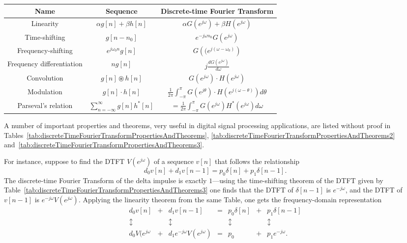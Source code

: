 \documentclass[\documentfontsize, twocolumn]{\classname}
\begin{document}
\begin{table*}[ht]
\centering
\begin{tabular}{ccc}
    \hline
    \textbf{Name} & \textbf{Sequence} & \textbf{Discrete-time Fourier Transform} \\
    \hline
    Linearity & $\alpha g[n] + \beta h[n]$ & $\alpha G(e^{j\omega}) + \beta H(e^{j\omega})$\\
    Time-shifting & $g[n-n_0]$ & $e^{-j\omega n_0} G(e^{j\omega})$ \\
    Frequency-shifting & $e^{j\omega_0 n}g[n]$ & $G\left((e^{j(\omega - \omega_0)}\right)$ \\
    Frequency differentiation & $ng[n]$ & $j\frac {dG(e^{j\omega})}{d\omega}$ \\
    Convolution & $g[n] \circledast h[n]$ &$ G(e^{j\omega}) \cdot H(e^{j\omega})$\\
    Modulation & $g[n] \cdot h[n]$ &$ \frac{1}{2\pi} \int_{-\pi}^\pi G(e^{j\theta}) \cdot H(e^{j(\omega - \theta)}) d\theta$\\
    \hline
    Parseval's relation & $\sum_{n=-\infty}^\infty g[n]h^*[n]$ &$= \frac 1 {2\pi} \int_{-\pi}^\pi G(e^{j\omega})H^*(e^{j\omega})d\omega$\\
    \hline
\end{tabular}
\caption{Notable discrete-time Fourier Transform properties.}\label{tab:discreteTimeFourierTransformPropertiesAndTheorems3}
\end{table*}

A number of important properties and theorems, very useful in digital signal processing applications, are listed without proof in Tables~\ref{tab:discreteTimeFourierTransformPropertiesAndTheorems}, \ref{tab:discreteTimeFourierTransformPropertiesAndTheorems2} and~\ref{tab:discreteTimeFourierTransformPropertiesAndTheorems3}.


For instance, suppose to find the DTFT $V(e^{j\omega})$ of a sequence $v[n]$ that follows the relationship
\[d_0 v[n] + d_1v[n-1] = p_0 \delta[n] + p_1\delta[n-1].\]
The discrete-time Fourier Transform of the delta impulse is exactly $1$---using the time-shifting theorem of the DTFT given by Table~\ref{tab:discreteTimeFourierTransformPropertiesAndTheorems3} one finds that the DTFT of $\delta[n-1]$ is $e^{-j\omega}$, and the DTFT of $v[n-1]$ is $e^{-j\omega}V(e^{j\omega})$. Applying the linearity theorem from the same Table, one gets the frequency-domain representation
\[
\begin{array}{ccccccc}
    d_0v[n] &+& d_1v[n-1] &=& p_0\delta[n] &+& p_1\delta[n-1]\\
    \updownarrow & & \updownarrow & & \updownarrow & & \updownarrow \\
    d_0V(e^{j\omega} &+& d_1e^{-j\omega}V(e^{j\omega}) &=& p_0 &+& p_1e^{-j\omega}.
\end{array}
\]
\end{document}
